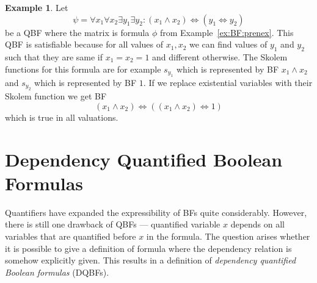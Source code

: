 \documentclass[
  digital, %
  twoside, %
  table,   %
  nolof,     %
  nolot,     %
]{fithesis3}
\let\setbuilder\set
\newcommand{\simpleset}[1]{\{{#1}\}}
\renewcommand{\set}[1]{\normalexpandarg\IfSubStr{#1}{|}{\setbuilder{#1}}{\simpleset{#1}}}
\theoremstyle{definition}
\newtheorem{example}{Example}
\theoremstyle{remark}
\newcommand{\BF}[1]{BF(#1)}
\newcommand{\lequal}{\Leftrightarrow}
\begin{document}
\begin{example}
\label{ex:QBF:prenex}
Let 
\[\psi = \forall x_1 \forall x_2 \exists y_1  \exists y_2  : (x_1 \land x_2) \lequal (y_1 \lequal y_2)\]
be a QBF where the matrix is formula $\phi$ from Example~\ref{ex:BF:prenex}. This QBF is satisfiable because for all values of $x_1, x_2$ we can find values of $y_1$ and $y_2$ such that they are same if $x_1 = x_2 = 1$ and different otherwise. The Skolem functions for this formula are for example $s_{y_1}$ which is represented by BF $x_1 \land x_2$ and $s_{y_2}$ which is represented by BF $1$. If we replace existential variables with their Skolem function we get BF
\[(x_1 \land x_2) \lequal ((x_1 \land x_2) \lequal 1)\]
which is true in all valuations.
\end{example}



\section{Dependency Quantified Boolean Formulas}
Quantifiers have expanded the expressibility of BFs quite considerably. However, there is still one drawback of QBFs --- quantified variable $x$ depends on all variables that are quantified before $x$ in the formula. The question arises whether it is possible to give a definition of formula where the dependency relation is somehow explicitly given. This results in a definition of \emph{dependency quantified Boolean formulas} (DQBFs).
\end{document}
